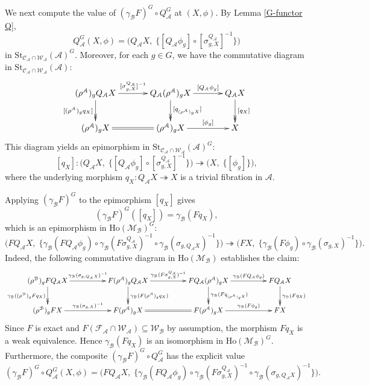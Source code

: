 \documentclass[12pt,twoside]{amsart}
\theoremstyle{bfupright head,slanted body}
\theoremstyle{bfupright head,upright body}
\theoremstyle{fixed bf head,slanted body}
\theoremstyle{fixed bf head,upright body}
\theoremstyle{numbered paragraph}
\newenvironment{prf*}[1][Proof]{%
  \begin{proof}[\bf #1]
    \setcounter{equation}{0}
    \renewcommand{\theequation}{\arabic{equation}}}
  {\end{proof}
}
\numberwithin{equation}{res}
\newcommand{\calC}{\mathcal{C}}
\newcommand{\calW}{\mathcal{W}}
\newcommand{\calF}{\mathcal{F}}
\newcommand{\calA}{\mathcal{A}}
\newcommand{\calB}{\mathcal{B}}
\newcommand{\calM}{\mathcal{M}}
\newcommand{\Ho}{\mathrm{Ho}}
\newcommand{\St}{\mathrm{St}}
\begin{document}
\begin{prf*}
We next compute the value of $(\gamma_\calB F)^G \circ Q_\calA^G$ at $(X,\phi)$.
By Lemma \ref{G-functor Q},
\[
Q_\calA^G(X,\phi) = \bigl(Q_\calA X,\; \{[Q_\calA \phi_g] \circ [\sigma^{Q_\calA}_{g,X}]^{-1}\}\bigr)
\]
in $\St_{\calC_\calA \cap \calW_\calA}(\calA)^G$.
Moreover, for each $g\in G$, we have the commutative diagram in $\St_{\calC_\calA\cap\calW_\calA}(\calA)$:
\[
\xymatrix@C=1.2CM{
   (\rho^\calA)_g Q_\calA X
\ar@{->>}[d]_-{[(\rho^\calA)_g q_X]}
\ar[r]^-{[\sigma^{Q_\calA}_{g, X}]^{-1}}
&  Q_\calA (\rho^\calA)_g X
\ar@{->>}[d]^-{[q_{(\rho^\calA)_g X}]}
\ar[r]^-{[Q_\calA \phi_g]}
&  Q_\calA X
\ar@{->>}[d]^-{[q_X]}             \\
   (\rho^\calA)_g X
\ar@{=}[r]
&  (\rho^\calA)_g X
\ar[r]^-{[\phi_g]}
&  X                                                        }
\]
This diagram yields an epimorphism in $\St_{\calC_\calA\cap\calW_\calA}(\calA)^G$:
\[
[q_X] : \bigl(Q_\calA X,\; \{[Q_\calA \phi_g] \circ [\sigma^{Q_\calA}_{g,X}]^{-1}\}\bigr)
        \twoheadrightarrow
        \bigl(X,\; \{[\phi_g]\}\bigr),
\]
where the underlying morphism $q_X : Q_\calA X \twoheadrightarrow X$ is a trivial fibration in $\calA$.

Applying $(\gamma_\calB F)^G$ to the epimorphism $[q_X]$ gives
\[
(\gamma_\calB F)^G([q_X]) = \gamma_\calB(F q_X),
\]
which is an epimorphism in $\Ho(\calM_\calB)^G$:
\[
\bigl(F Q_\calA X,\; \{\gamma_\calB(F Q_\calA \phi_g) \circ \gamma_\calB(F \sigma^{Q_\calA}_{g,X})^{-1} \circ \gamma_\calB(\sigma_{g,Q_\calA X})^{-1}\}\bigr)
\twoheadrightarrow
\bigl(FX,\; \{\gamma_\calB(F \phi_g) \circ \gamma_\calB(\sigma_{g,X})^{-1}\}\bigr).
\]
Indeed, the following commutative diagram in $\Ho(\calM_\calB)$ establishes the claim:
\[
\xymatrix@C=1.75CM{
   (\rho^\calB)_g F Q_\calA X
\ar@{->>}[d]_-{\gamma_\calB((\rho^\calB)_g F q_X)}
\ar[r]^-{\gamma_\calB(\sigma_{g, Q_\calA X})^{-1}}
&  F (\rho^\calA)_g Q_\calA X
\ar@{->>}[d]^-{\gamma_\calB(F (\rho^\calA)_g q_X)}
\ar[r]^-{\gamma_\calB(F \sigma^{Q_\calA}_{g, X})^{-1}}
&  F Q_\calA (\rho^\calA)_g X
\ar@{->>}[d]^-{\gamma_\calB(F q_{(\rho^\calA)_g X})}
\ar[r]^-{\gamma_\calB(F Q_\calA \phi_g)}
&  F Q_\calA X
\ar@{->>}[d]^-{\gamma_\calB(F q_X)}             \\
   (\rho^\calB)_g F X
\ar[r]^-{\gamma_\calB(\sigma_{g, X})^{-1}}
&  F (\rho^\calA)_g X
\ar@{=}[r]
&  F (\rho^\calA)_g X                                               \ar[r]^-{\gamma_\calB(F \phi_g)}
&  F X                                                        }
\]
Since $F$ is exact and $F(\calF_\calA \cap \calW_\calA) \subseteq \calW_\calB$ by assumption, the morphism $Fq_X$ is a weak equivalence.
Hence $\gamma_\calB(Fq_X)$ is an isomorphism in $\Ho(\calM_\calB)^G$.
Furthermore, the composite $(\gamma_\calB F)^G \circ Q_\calA^G$ has the explicit value
\[
(\gamma_\calB F)^G \circ Q_\calA^G(X,\phi)
= \bigl(F Q_\calA X,\; \{\gamma_\calB(F Q_\calA \phi_g)\circ\gamma_\calB(F \sigma^{Q_\calA}_{g,X})^{-1}\circ\gamma_\calB(\sigma_{g,Q_\calA X})^{-1}\}\bigr).
\]


\end{prf*}
\end{document}
